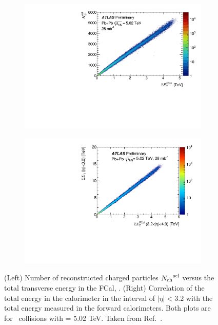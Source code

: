  \begin{figure}
\centering
\begin{subfigure}{.45\textwidth}
  \centering
  \includegraphics[width=\linewidth]{figures/setup/nch_fcal}
          \caption{}
          \label{fig:nch_fcal}
\end{subfigure}
\qquad  \qquad  
\begin{subfigure}{.45\textwidth}  
  \centering
  \includegraphics[width=\linewidth]{figures/setup/fcal_barrel}
          \caption{}
          \label{fig:fcal_barrel}
\end{subfigure}
\caption{(Left) Number of reconstructed charged particles $\mbox{$N_{\mathrm{ch}}$}^{\rm sel}$ versus the total transverse energy in the FCal, \ETfcal.
(Right) Correlation of the total energy in the calorimeter in the interval of $|\eta| < 3.2$ with the total energy measured in the forward calorimeters.
Both plots are for \pbpb\ collisions with \sqrtsnn = 5.02 TeV.
Taken from Ref.~\cite{perfPlots}.}
\label{fig:jetcs}
\end{figure}



